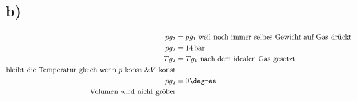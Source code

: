 

\subsection*{b)}
\begin{align*}
    p g_2 &= p g_1 \text{ weil noch immer selbes Gewicht auf Gas drückt} \\
    p g_2 &= 14 \, \text{bar} \\
    T g_2 &= T g_1 \text{ nach dem idealen Gas gesetzt} \\
    \text{bleibt die Temperatur gleich wenn } p \text{ konst } \& V \text{ konst} \\
    p g_2 &= 0 \degree \\
    \text{Volumen wird nicht größer}
\end{align*}